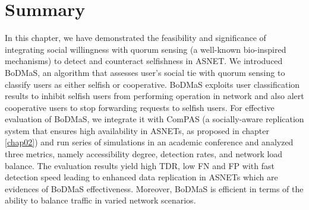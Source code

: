 \section{Summary}\label{Chap6_06}
In this chapter, we have demonstrated the feasibility and significance of integrating social willingness with quorum sensing (a well-known bio-inspired mechanisms) to detect and counteract selfishness in ASNET. We introduced BoDMaS, an algorithm that assesses user's social tie with quorum sensing to classify users as either selfish or cooperative. BoDMaS exploits user classification results to inhibit selfish users from performing operation in network and also alert cooperative users to stop forwarding requests to selfish users. For effective evaluation of BoDMaS, we integrate it with ComPAS (a socially-aware replication system that ensures high availability in ASNETs, as proposed in chapter \ref{chap02}) and run series of simulations in an academic conference and analyzed three metrics, namely accessibility degree, detection rates, and network load balance. The evaluation results yield high TDR, low FN and FP with fast detection speed leading to enhanced data replication in ASNETs which are evidences of BoDMaS effectiveness. Moreover, BoDMaS is efficient in terms of the ability to balance traffic in varied network scenarios.
